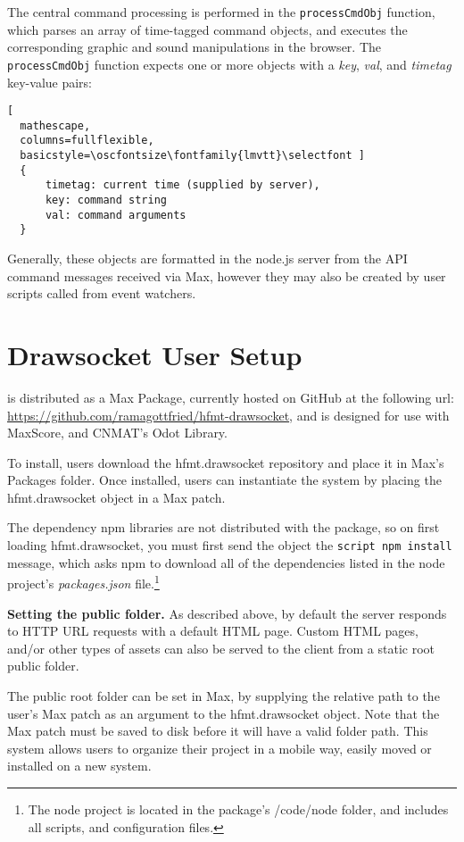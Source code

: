 The central command processing is performed in the \linebreak\texttt{processCmdObj} function, which parses an array of time-tagged command objects, and executes the corresponding graphic and sound manipulations in the browser. The \linebreak\texttt{processCmdObj} function expects one or more objects with a \textit{key}, \textit{val}, and \textit{timetag} key-value pairs:

\begin{lstlisting}[
  mathescape,
  columns=fullflexible,
  basicstyle=\oscfontsize\fontfamily{lmvtt}\selectfont ]
  {
      timetag: current time (supplied by server),
      key: command string
      val: command arguments
  }
\end{lstlisting}
\noindent
Generally, these objects are formatted in the node.js server from the API command messages received via Max, however they may also be created by user scripts called from event watchers.

\section{Drawsocket User Setup}\label{sec:setup}
\drawsocket is distributed as a Max Package, currently hosted on GitHub at the following url: \url{https://github.com/ramagottfried/hfmt-drawsocket}, and is designed for use with MaxScore, and CNMAT's Odot Library.

To install, users download the hfmt.drawsocket repository and place it in Max's Packages folder. Once installed, users can instantiate the \drawsocket system by placing the hfmt.drawsocket object in a Max patch.

The dependency npm libraries are not distributed with the package, so on first loading hfmt.drawsocket, you must first send the object the \texttt{script npm install} message, which asks npm to download all of the dependencies listed in the node project's \textit{packages.json} file.\footnote{The node project is located in the package's /code/node folder, and includes all scripts, and configuration files.}

\medskip
\noindent
\textbf{Setting the public folder.}  As described above, by default the \drawsocket server responds to HTTP URL requests with a default HTML page. Custom HTML pages, and/or other types of assets can also be served to the client from a static root public folder. 

The public root folder can be set in Max, by supplying the relative path to the user's Max patch as an argument to the hfmt.drawsocket object.
Note that the Max patch must be saved to disk before it will have a valid folder path.
This system allows users to organize their project in a mobile way, easily moved or installed on a new system.

